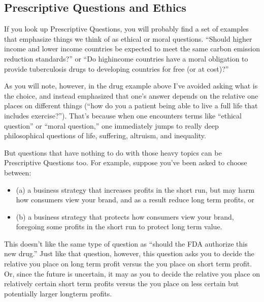 \documentclass[letterpaper,10pt,english]{jupyterBook}
\begin{document}
\subsection{Prescriptive Questions and Ethics}
\label{\detokenize{30_questions/05_descriptive_v_prescriptive:prescriptive-questions-and-ethics}}
\sphinxAtStartPar
If you look up Prescriptive Questions, you will probably find a set of examples that emphasize things we think of as ethical or moral questions. “Should higher income and lower income countries be expected to meet the same carbon emission reduction standards?” or “Do high\sphinxhyphen{}income countries have a moral obligation to provide tuberculosis drugs to developing countries for free (or at cost)?”

\sphinxAtStartPar
As you will note, however, in the drug example above I’ve avoided asking what is the  choice, and instead emphasized that one’s answer depends on the relative  one places on different things (“how do you  a patient being able to live a full life that includes exercise?”). That’s because when one encounters terms like “ethical question” or “moral question,” one immediately jumps to really deep philosophical questions of life, suffering, altruism, and inequality.

\sphinxAtStartPar
But questions that have nothing to do with those heavy topics can be Prescriptive Questions too. For example, suppose you’ve been asked to choose between:
\begin{itemize}
\item {} 
\sphinxAtStartPar
(a) a business strategy that increases profits in the short run, but may harm how consumers view your brand, and as a result reduce long term profits, or

\item {} 
\sphinxAtStartPar
(b) a business strategy that protects how consumers view your brand, foregoing some profits in the short run to protect long term value.

\end{itemize}

\sphinxAtStartPar
This doesn’t  like the same type of question as “should the FDA authorize this new drug.” Just like that question, however, this question asks you to decide the relative  you place on long term profit versus the  you place on short term profit. Or, since the future is uncertain, it may as you to decide the relative  you place on relatively certain short term profits versus the  you place on less certain but potentially larger long\sphinxhyphen{}term profits.
\end{document}

